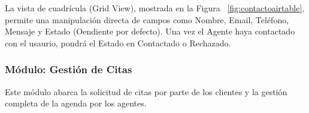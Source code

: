 \begin{enumerate}
\begin{enumerate}
        La vista de cuadrícula (Grid View), mostrada en la Figura ~\ref{fig:contactoairtable}, permite una manipulación directa de campos como Nombre, Email, Teléfono, Mensaje y Estado (Oendiente por defecto). Una vez el Agente haya contactado con el usaurio, pondrá el Estado en Contactado o Rechazado.

    \end{enumerate}

\end{enumerate}


\subsubsection{Módulo: Gestión de Citas}


Este módulo abarca la solicitud de citas por parte de los clientes y la gestión completa de la agenda por los agentes.

